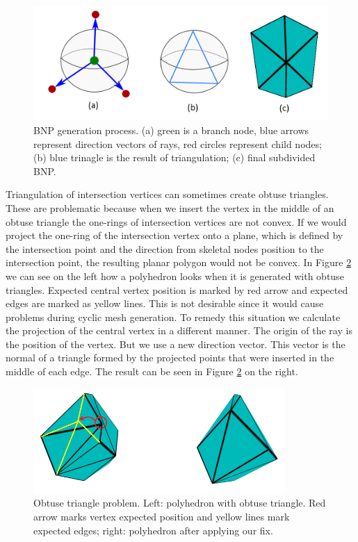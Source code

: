 \begin{figure}[h]
    \centering
    \includegraphics[width=\textwidth]{images/bnp_gen_ilu.png}
    \caption[BNP generation process]{BNP generation process. (a) green is a branch node, blue arrows represent direction vectors of rays, red circles represent child nodes; (b) blue trinagle is the result of triangulation; (c) final subdivided BNP.}
    \label{fig:bnp_gen_ilu}
\end{figure}

Triangulation of intersection vertices can sometimes create obtuse triangles. These are problematic because when we insert the vertex in the middle of an obtuse triangle the one-rings of intersection vertices are not convex. If we would project the one-ring of the intersection vertex onto a plane, which is defined by the intersection point and the direction from skeletal nodes position to the intersection point, the resulting planar polygon would not be convex. In Figure \ref{fig:obtus_tri_ilu} we can see on the left how a polyhedron looks when it is generated with obtuse triangles. Expected central vertex position is marked by red arrow and expected edges are marked as yellow lines. This is not desirable since it would cause problems during cyclic mesh generation. To remedy this situation we calculate the projection of the central vertex in a different manner. The origin of the ray is the position of the vertex. But we use a new direction vector. This vector is the normal of a triangle formed by the projected points that were inserted in the middle of each edge. The result can be seen in Figure \ref{fig:obtus_tri_ilu} on the right.

\begin{figure}[h]
    \centering
    \includegraphics[height=4cm]{images/obtuse_triangle_fix_ilu.png}
    \caption[Obtuse triangle problem]{Obtuse triangle problem. Left: polyhedron with obtuse triangle. Red arrow marks vertex expected position and yellow lines mark expected edges; right: polyhedron after applying our fix.}
    \label{fig:obtus_tri_ilu}
\end{figure}

